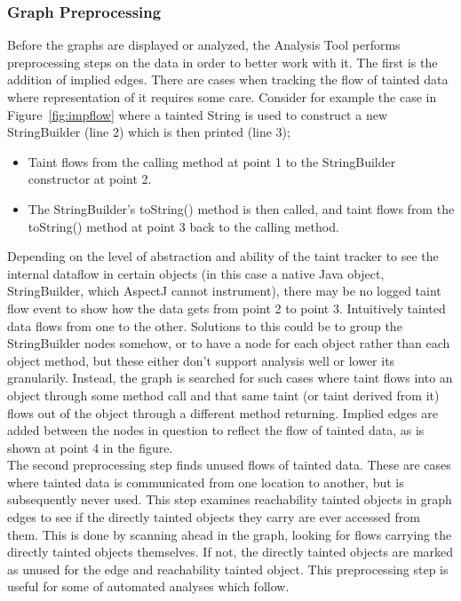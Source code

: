 \documentclass[msc,oneside]{ubcthesis}
\begin{document}
\subsubsection{Graph Preprocessing}
\label{subsub:impliededges}
Before the graphs are displayed or analyzed, the Analysis Tool performs preprocessing steps on the data in order to better work with it. The first is the addition of implied edges. There are cases when tracking the flow of tainted data where representation of it requires some care. Consider for example the case in Figure~\ref{fig:impflow} where a tainted String is used to construct a new StringBuilder (line 2) which is then printed (line 3); 
\begin{itemize}
\item Taint flows from the calling method at point 1 to the StringBuilder constructor at point 2.
\item The StringBuilder's toString() method is then called, and taint flows from the toString() method at point 3 back to the calling method.
\end{itemize}
Depending on the level of abstraction and ability of the taint tracker to see the internal dataflow in certain objects (in this case a native Java object, StringBuilder, which AspectJ cannot instrument), there may be no logged taint flow event to show how the data gets from point 2 to point 3. Intuitively tainted data flows from one to the other. Solutions to this could be to group the StringBuilder nodes somehow, or to have a node for each object rather than each object method, but these either don't support analysis well or lower its granularily. Instead, the graph is searched for such cases where taint flows into an object through some method call and that same taint (or taint derived from it) flows out of the object through a different method returning. Implied edges are added between the nodes in question to reflect the flow of tainted data, as is shown at point 4 in the figure.\\

The second preprocessing step finds unused flows of tainted data. These are cases where tainted data is communicated from one location to another, but is subsequently never used. This step examines reachability tainted objects in graph edges to see if the directly tainted objects they carry are ever accessed from them. This is done by scanning ahead in the graph, looking for flows carrying the directly tainted objects themselves. If not, the directly tainted objects are marked as unused for the edge and reachability tainted object. This preprocessing step is useful for some of automated analyses which follow.
\end{document}

